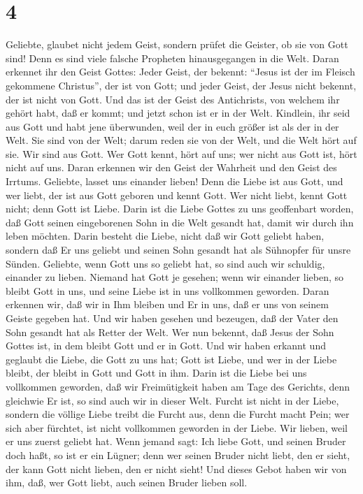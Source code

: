 \hypertarget{section-3}{%
\section{4}\label{section-3}}

 Geliebte, glaubet nicht jedem Geist, sondern prüfet die
Geister, ob sie von Gott sind! Denn es sind viele falsche Propheten
hinausgegangen in die Welt.  Daran erkennet ihr den Geist
Gottes: Jeder Geist, der bekennt: ``Jesus ist der im Fleisch gekommene
Christus'', der ist von Gott;  und jeder Geist, der Jesus
nicht bekennt, der ist nicht von Gott. Und das ist der Geist des
Antichrists, von welchem ihr gehört habt, daß er kommt; und jetzt schon
ist er in der Welt.  Kindlein, ihr seid aus Gott und habt
jene überwunden, weil der in euch größer ist als der in der Welt.
 Sie sind von der Welt; darum reden sie von der Welt, und
die Welt hört auf sie.  Wir sind aus Gott. Wer Gott kennt,
hört auf uns; wer nicht aus Gott ist, hört nicht auf uns. Daran erkennen
wir den Geist der Wahrheit und den Geist des Irrtums. 
Geliebte, lasset uns einander lieben! Denn die Liebe ist aus Gott, und
wer liebt, der ist aus Gott geboren und kennt Gott.  Wer
nicht liebt, kennt Gott nicht; denn Gott ist Liebe.  Darin
ist die Liebe Gottes zu uns geoffenbart worden, daß Gott seinen
eingeborenen Sohn in die Welt gesandt hat, damit wir durch ihn leben
möchten.  Darin besteht die Liebe, nicht daß wir Gott
geliebt haben, sondern daß Er uns geliebt und seinen Sohn gesandt hat
als Sühnopfer für unsre Sünden.  Geliebte, wenn Gott uns
so geliebt hat, so sind auch wir schuldig, einander zu lieben.
 Niemand hat Gott je gesehen; wenn wir einander lieben,
so bleibt Gott in uns, und seine Liebe ist in uns vollkommen geworden.
 Daran erkennen wir, daß wir in Ihm bleiben und Er in
uns, daß er uns von seinem Geiste gegeben hat.  Und wir
haben gesehen und bezeugen, daß der Vater den Sohn gesandt hat als
Retter der Welt.  Wer nun bekennt, daß Jesus der Sohn
Gottes ist, in dem bleibt Gott und er in Gott.  Und wir
haben erkannt und geglaubt die Liebe, die Gott zu uns hat; Gott ist
Liebe, und wer in der Liebe bleibt, der bleibt in Gott und Gott in ihm.
 Darin ist die Liebe bei uns vollkommen geworden, daß wir
Freimütigkeit haben am Tage des Gerichts, denn gleichwie Er ist, so sind
auch wir in dieser Welt.  Furcht ist nicht in der Liebe,
sondern die völlige Liebe treibt die Furcht aus, denn die Furcht macht
Pein; wer sich aber fürchtet, ist nicht vollkommen geworden in der
Liebe.  Wir lieben, weil er uns zuerst geliebt hat.
 Wenn jemand sagt: Ich liebe Gott, und seinen Bruder doch
haßt, so ist er ein Lügner; denn wer seinen Bruder nicht liebt, den er
sieht, der kann Gott nicht lieben, den er nicht sieht! 
Und dieses Gebot haben wir von ihm, daß, wer Gott liebt, auch seinen
Bruder lieben soll.

